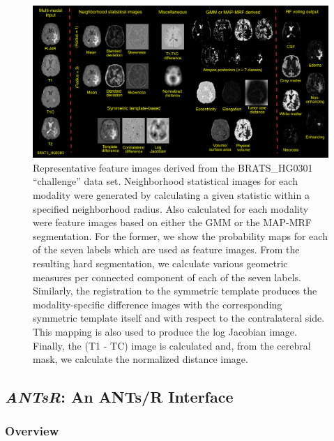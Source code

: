 \documentclass[preprint,authoryear,review,12pt]{elsarticle}
\begin{document}
{\begin{figure}[h]
  \includegraphics[width=150mm]{Figures/featureImages.pdf}
  \caption{Representative feature images derived from the 
           BRATS\_HG0301  ``challenge'' data set.
           Neighborhood statistical images for each modality were 
           generated by calculating a given statistic within
           a specified neighborhood radius.  Also calculated for each modality were feature
           images based on either the GMM or the MAP-MRF segmentation.  For the former, we
           show the probability maps for each of the seven labels which are used as feature
           images.  From the resulting hard segmentation, we calculate various geometric 
           measures per connected component of each of the seven labels.  Similarly, the 
           registration to the symmetric template produces the modality-specific 
           difference images with the
           corresponding symmetric template itself and with respect to the 
           contralateral side.   
           This mapping is also used to produce the log Jacobian image.  Finally, the 
           (T1 - TC) image is calculated and, from the
           cerebral mask, we calculate the normalized distance image.  
           }
  \label{fig:featureImages}         
\end{figure}


\subsection{\textit{ANTsR}:  An ANTs/R Interface}

\subsubsection{Overview}

}
\end{document}
